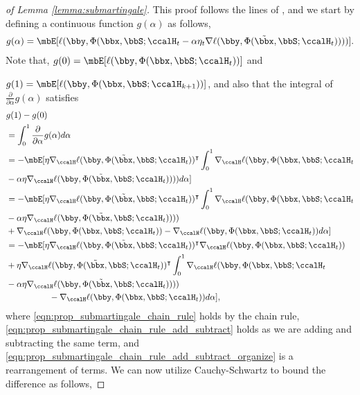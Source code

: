 \begin{proof}[of Lemma \ref{lemma:submartingale}]
	This proof follows the lines of \cite{bertsekas2000gradient}, and we start by defining a continuous function $g(\alpha)$ as follows, 
	\begin{align}
		g(\alpha)=\mbE[\ell(\bby,\Phi(\bbx,\bbS;\ccalH_t-\alpha\eta_t\nabla\ell(\bby,\Phi(\tilde \bbx,\bbS;\ccalH_t))))].
	\end{align}
	Note that, $g(0)=\mbE[\ell(\bby,\Phi(\bbx,\bbS;\ccalH_t))]$ and 
 
 $g(1)=\mbE[\ell(\bby,\Phi(\bbx,\bbS;\ccalH_{k+1}))]$, and also that the integral of $\frac{\partial}{\partial \alpha} g(\alpha)$ satisfies
	\begin{align}
		&g(1)-g(0)\nonumber\\
  &= \int_{0}^1 \frac{\partial}{\partial \alpha} g(\alpha) d\alpha \\
		&=  - \mbE[\eta\nabla_\ccalH\ell(\bby,\Phi(\tilde \bbx,\bbS;\ccalH_t))^\intercal \int_{0}^1\nabla_\ccalH\ell(\bby,\Phi(\bbx,\bbS;\ccalH_t\nonumber\\
  &-\alpha\eta\nabla_\ccalH\ell(\bby,\Phi(\tilde \bbx,\bbS;\ccalH_t))))d\alpha]\label{eqn:prop_submartingale_chain_rule}\\
		&=  - \mbE[\eta\nabla_\ccalH\ell(\bby,\Phi(\tilde \bbx,\bbS;\ccalH_t))^\intercal \int_{0}^1\nabla_\ccalH\ell(\bby,\Phi(\bbx,\bbS;\ccalH_t\nonumber\\
  &-\alpha\eta\nabla_\ccalH\ell(\bby,\Phi(\tilde \bbx,\bbS;\ccalH_t))))\\
		&+\nabla_\ccalH\ell(\bby,\Phi(\bbx,\bbS;\ccalH_t))-\nabla_\ccalH\ell(\bby,\Phi(\bbx,\bbS;\ccalH_t))d\alpha
		]\label{eqn:prop_submartingale_chain_rule_add_subtract}\\
		&=- \mbE[\eta\nabla_\ccalH\ell(\bby,\Phi(\tilde \bbx,\bbS;\ccalH_t)) ^\intercal\nabla_\ccalH\ell(\bby,\Phi(\bbx,\bbS;\ccalH_t))\nonumber\\
		&+\eta\nabla_\ccalH\ell(\bby,\Phi(\tilde \bbx,\bbS;\ccalH_t)) ^\intercal\int_{0}^1\nabla_\ccalH\ell(\bby,\Phi(\bbx,\bbS;\ccalH_t\nonumber\\
  &-\alpha\eta\nabla_\ccalH\ell(\bby,\Phi(\tilde \bbx,\bbS;\ccalH_t))))\nonumber\\
		&\quad\quad\quad\quad\quad-\nabla_\ccalH\ell(\bby,\Phi(\bbx,\bbS;\ccalH_t))d\alpha
		]\label{eqn:prop_submartingale_chain_rule_add_subtract_organize},
	\end{align}
	where \eqref{eqn:prop_submartingale_chain_rule} holds by the chain rule, \eqref{eqn:prop_submartingale_chain_rule_add_subtract} holds as we are adding and subtracting the same term, and \eqref{eqn:prop_submartingale_chain_rule_add_subtract_organize} is a rearrangement of terms. We can now utilize Cauchy-Schwartz to bound the difference as follows, 
	

\end{proof}
